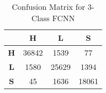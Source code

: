 \documentclass[12pt,letterpaper,oneside,reqno]{book}
\theoremstyle{plain}
\theoremstyle{definition}
\theoremstyle{plain}
\theoremstyle{remark}
\theoremstyle{plain}
\theoremstyle{definition}
\theoremstyle{plain}
\begin{document}
\begin{table}[H]
\centering
		\begin{tabular}{|c|c|c|c|}
				\hline
				& \textbf{H} & \textbf{L} & \textbf{S} \\
				\hline
				\textbf{H} & 36842 & 1539 & 77 \\
				\hline
				\textbf{L} & 1580 & 25629 & 1394 \\
				\hline
				\textbf{S} & 45 & 1636 & 18061 \\
				\hline
		\end{tabular}
		\caption{Confusion Matrix for 3-Class FCNN}
		\label{tab:confmatfcnn3}
\end{table}
\end{document}
